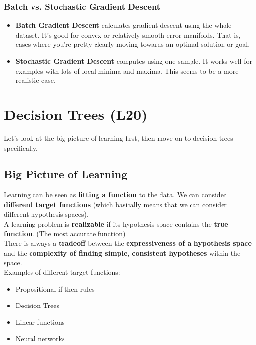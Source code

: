\documentclass[english, 10pt]{article}
\begin{document}
\subsubsection{Batch vs. Stochastic Gradient Descent}

\begin{itemize}
	\item \textbf{Batch Gradient Descent} calculates gradient descent using the whole dataset. It's good for convex or relatively smooth error manifolds. That is, cases where you're pretty clearly moving towards an optimal solution or goal.
	\item \textbf{Stochastic Gradient Descent} computes using one sample. It works well for examples with lots of local minima and maxima. This seems to be a more realistic case.
\end{itemize}


\section{Decision Trees (L20)}

Let's look at the big picture of learning first, then move on to decision trees specifically.

\subsection{Big Picture of Learning}

Learning can be seen as \textbf{fitting a function} to the data. We can consider \textbf{different target functions} (which basically means that we can consider different hypothesis spaces).\\

A learning problem is \textbf{realizable} if its hypothesis space contains the \textbf{true function}. (The most accurate function)\\

There is always a \textbf{tradeoff} between the \textbf{expressiveness of a hypothesis space} and the \textbf{complexity of finding simple, consistent hypotheses} within the space.\\

Examples of different target functions:
\begin{itemize}
	\item Propositional if-then rules
	\item Decision Trees
	\item Linear functions
	\item Neural networks
\end{itemize}
\end{document}

